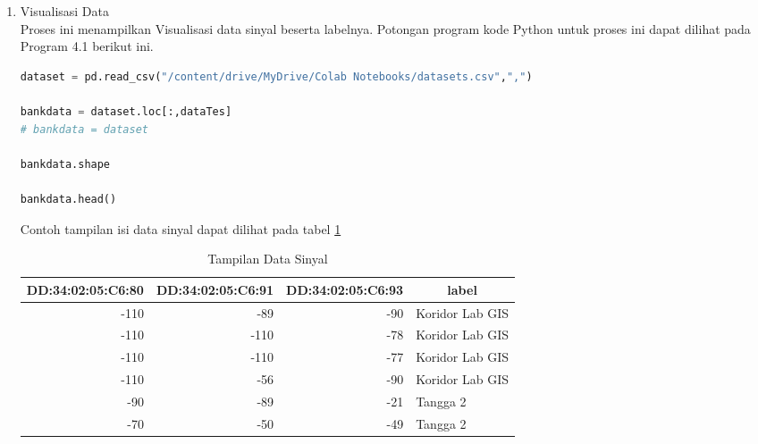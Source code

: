\begin{enumerate} [1.]
	\item Visualisasi Data
	      \\ Proses ini menampilkan Visualisasi data sinyal beserta labelnya. Potongan program kode Python untuk proses ini dapat dilihat pada Program 4.1 berikut ini.
	      \\
	      \begin{lstlisting}[label=MinMAxdanPCA,language=Python]
dataset = pd.read_csv("/content/drive/MyDrive/Colab Notebooks/datasets.csv",",")

bankdata = dataset.loc[:,dataTes]
# bankdata = dataset

bankdata.shape

bankdata.head()
					\end{lstlisting}

	      \par Contoh tampilan isi data sinyal dapat dilihat pada tabel \ref{Contoh-Data-Sinyal}

	      \begin{table}[H]
		      \center
		      \fontsize{10}{12}\selectfont
		      \caption{Tampilan Data Sinyal}
		      \label{Contoh-Data-Sinyal}
		      \begin{tabular}{|r|r|r|l|}
			      \hline
			      \multicolumn{1}{|l|}{DD:34:02:05:C6:80} & \multicolumn{1}{l|}{DD:34:02:05:C6:91} & \multicolumn{1}{l|}{DD:34:02:05:C6:93} & \multicolumn{1}{c|}{label} \\ \hline
			      -110                                    & -89                                    & -90                                    & Koridor Lab GIS            \\ \hline
			      -110                                    & -110                                   & -78                                    & Koridor Lab GIS            \\ \hline
			      -110                                    & -110                                   & -77                                    & Koridor Lab GIS            \\ \hline
			      -110                                    & -56                                    & -90                                    & Koridor Lab GIS            \\ \hline
			      -90                                     & -89                                    & -21                                    & Tangga 2                   \\ \hline
			      -70                                     & -50                                    & -49                                    & Tangga 2                   \\ \hline
		      \end{tabular}
	      \end{table}


\end{enumerate}
